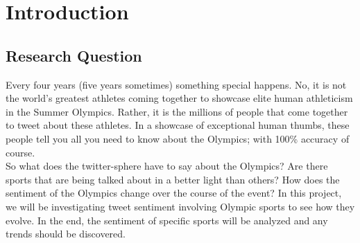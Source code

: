 \documentclass[12pt]{article}
\begin{document}
    \tableofcontents

    \section{Introduction}
        \subsection{Research Question}
            Every four years (five years sometimes) something special happens. No, it is not the world's greatest athletes coming together to showcase elite human athleticism in the
            Summer Olympics. Rather, it is the millions of people that come together to tweet about these athletes. In a showcase of exceptional human thumbs, these people tell you all
            you need to know about the Olympics; with 100\% accuracy of course. \\ 

            So what does the twitter-sphere have to say about the Olympics? Are there sports that are being talked about in a better light than others? How does the sentiment of the
            Olympics change over the course of the event? In this project, we will be investigating tweet sentiment involving Olympic sports to see how they evolve. In the end, the 
            sentiment of specific sports will be analyzed and any trends should be discovered.
\end{document}
